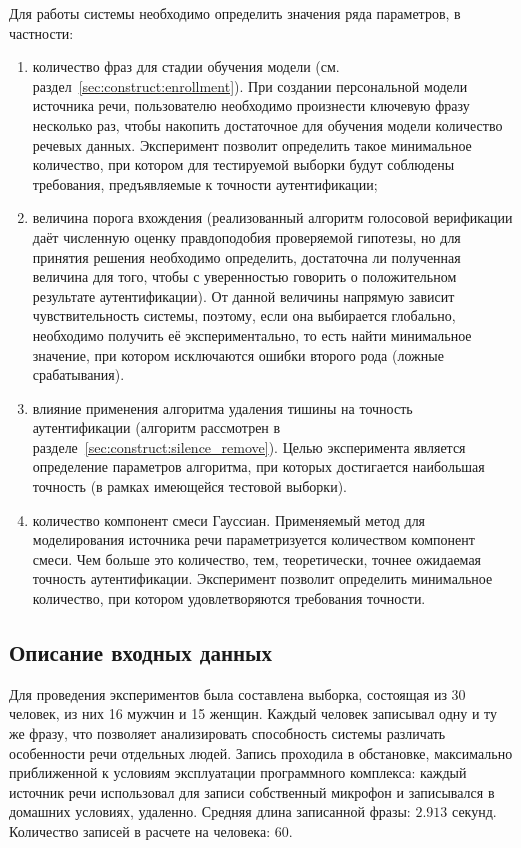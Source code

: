Для работы системы необходимо определить значения ряда параметров, в частности:

\begin{enumerate}

\item количество фраз для стадии обучения модели (см.
раздел~\ref{sec:construct:enrollment}). При создании персональной модели
источника речи, пользователю необходимо произнести ключевую фразу несколько раз,
чтобы накопить достаточное для обучения модели количество речевых данных.
Эксперимент позволит определить такое минимальное количество, при котором для
тестируемой выборки будут соблюдены требования, предъявляемые к точности
аутентификации;

\item величина порога вхождения (реализованный алгоритм голосовой верификации даёт
численную оценку правдоподобия проверяемой гипотезы, но для принятия решения
необходимо определить, достаточна ли полученная величина для того, чтобы с
уверенностью говорить о положительном результате аутентификации). От данной
величины напрямую зависит чувствительность системы, поэтому, если она выбирается
глобально, необходимо получить её экспериментально, то есть найти минимальное
значение, при котором исключаются ошибки второго рода (ложные срабатывания).

\item влияние применения алгоритма удаления тишины на точность аутентификации (алгоритм
рассмотрен в разделе~\ref{sec:construct:silence_remove}). Целью эксперимента
является определение параметров алгоритма, при которых достигается наибольшая
точность (в рамках имеющейся тестовой выборки).

\item количество компонент смеси Гауссиан. Применяемый метод для моделирования
источника речи параметризуется количеством компонент смеси. Чем больше это
количество, тем, теоретически, точнее ожидаемая точность аутентификации.
Эксперимент позволит определить минимальное количество, при котором
удовлетворяются требования точности.

\end{enumerate}

\subsection{Описание входных данных}

Для проведения экспериментов была составлена выборка, состоящая из 30 человек,
из них 16 мужчин и 15 женщин. Каждый человек записывал одну и ту же фразу, что
позволяет анализировать способность системы различать особенности речи отдельных
людей. Запись проходила в обстановке, максимально приближенной к условиям
эксплуатации программного комплекса: каждый источник речи использовал для записи
собственный микрофон и записывался в домашних условиях, удаленно. Средняя длина
записанной фразы: $2.913$ секунд. Количество записей в расчете на человека:
$60$.

